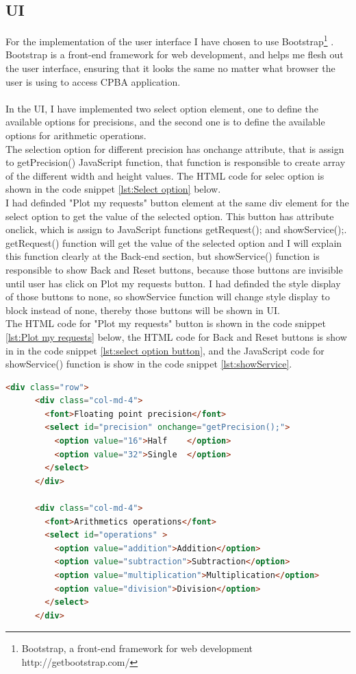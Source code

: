 \documentclass[11pt]{article}
\begin{document}
\subsection{UI}
For the implementation of the user interface I have chosen to use Bootstrap\footnote{Bootstrap, a front-end framework for web development http://getbootstrap.com/} . Bootstrap is a front-end framework for web development, and helps me flesh out the user interface, ensuring that it looks the same no matter what browser the user is using to access CPBA application.\\\\
In the UI, I have implemented two select option element, one to define the available options for precisions, and the second one is to define the available options for arithmetic operations.\\
The selection option for different precision has onchange attribute, that is assign to getPrecision() JavaScript function, that function is responsible to create array of the different width and height values. The HTML code for selec option is shown in the code snippet \ref{lst:Select option} below.\\

I had definded "Plot my requests" button element at the same div element for the select option to get the value of the selected option. This button has attribute onclick, which is assign to JavaScript functions getRequest(); and showService();. getRequest() function will get the value of the selected option and I will explain this function clearly at the Back-end section, but showService() function is responsible to show Back and Reset buttons, because those buttons are invisible until user has click on Plot my requests button. I had definded the style display of those buttons to none, so showService function will change style display to block instead of none, thereby those buttons will be shown in UI.\\
The HTML code for "Plot my requests" button is shown in the code snippet \ref{lst:Plot my requests} below, the HTML code for Back and Reset buttons is show in in the code snippet \ref{lst:select option button}, and the JavaScript code for showService() function is show in the code snippet \ref{lst:showService}.\\

\begin{lstlisting}[label={lst:Select option}, language=HTML, caption={Select option for precisions and arithmetic operations},]
	<div class="row">
      <div class="col-md-4">
        <font>Floating point precision</font>
        <select id="precision" onchange="getPrecision();">      
          <option value="16">Half    </option>
          <option value="32">Single  </option>
        </select>
      </div>

      <div class="col-md-4">
        <font>Arithmetics operations</font>
        <select id="operations" > 
          <option value="addition">Addition</option>
          <option value="subtraction">Subtraction</option>
          <option value="multiplication">Multiplication</option>
          <option value="division">Division</option>
        </select>
      </div>
\end{lstlisting}
\end{document}
